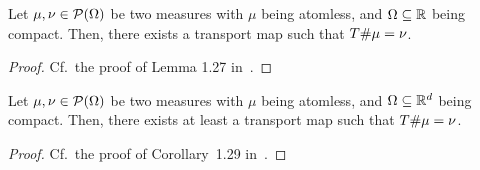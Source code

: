 \begin{lemma}\label{1DTransMapExist}
	Let $\mu, \nu \in \mathcal{P}(\Omega)$ be two measures with $\mu$ being atomless, and $\Omega \subseteq \mathbb{R}$ being compact. Then, there exists a transport map \map[T]{\Omega}{\Omega} such that ${T} \# \mu = \nu$.
\end{lemma}

\begin{proof}
	Cf.~the proof of Lemma 1.27 in~\cite{San2015}.
\end{proof}



\begin{theorem}\label{NDTransMapExist}
	Let $\mu, \nu \in \mathcal{P}(\Omega)$ be two measures with $\mu$ being atomless, and $\Omega \subseteq \mathbb{R}^d$ being compact. Then, there exists at least a transport map \map[T]{\Omega}{\Omega} such that ${T} \# \mu = \nu$.
\end{theorem}

\begin{proof}
	Cf.\ the proof of Corollary~1.29 in\ \cite{San2015}.
\end{proof}



